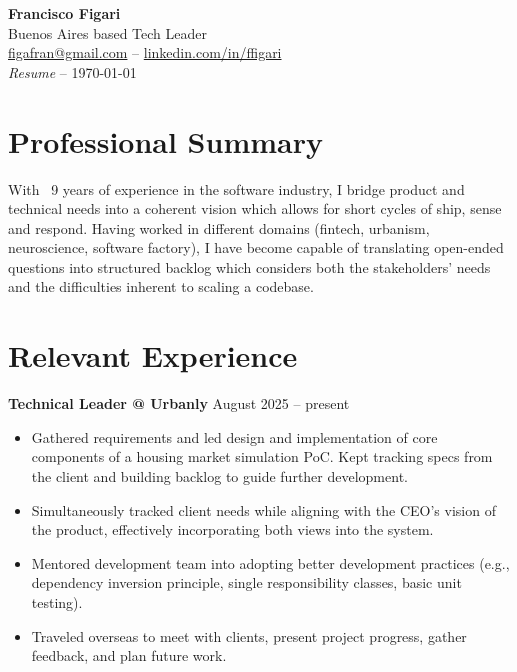 \documentclass[a4paper]{article}
\begin{document}
\begin{center}
  {\Large \textbf{Francisco Figari}} \\[4pt]
  Buenos Aires based Tech Leader \\[2pt]
  {\small \href{mailto:figafran@gmail.com}{figafran@gmail.com} -- \href{https://www.linkedin.com/in/ffigari}{linkedin.com/in/ffigari}} \\[2pt]
  {\small \textit{Resume} -- \monthyeardate\today}
\end{center}

\vspace{0.5em}

\section*{Professional Summary}

With ~9 years of experience in the software industry, I bridge product and
technical needs into a coherent vision which allows for short cycles of ship,
sense and respond. Having worked in different domains (fintech, urbanism,
neuroscience, software factory), I have become capable of translating open-ended
questions into structured backlog which considers both the stakeholders' needs
and the difficulties inherent to scaling a codebase.

\section*{Relevant Experience}

\textbf{Technical Leader @ Urbanly} \hfill August 2025 -- present
\begin{itemize}
  \item Gathered requirements and led design and implementation of core
    components of a housing market simulation PoC. Kept tracking specs from the
    client and building backlog to guide further development.
  \item Simultaneously tracked client needs while aligning with the CEO's
    vision of the product, effectively incorporating both views into the
    system.
  \item Mentored development team into adopting better development practices
    (e.g., dependency inversion principle, single responsibility classes, basic
    unit testing).
  \item Traveled overseas to meet with clients, present project progress,
    gather feedback, and plan future work.
\end{itemize}
\end{document}
